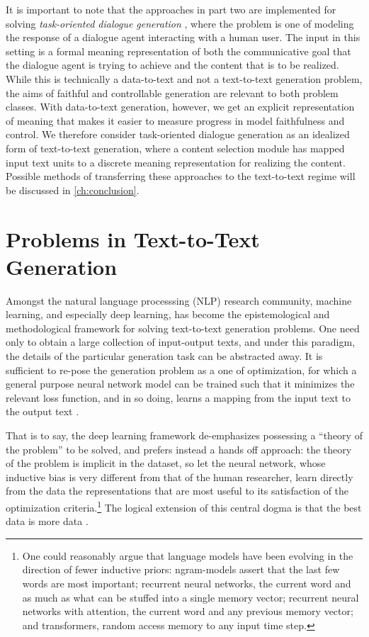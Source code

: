 It is important to note that the approaches in part two are implemented for
solving \textit{task-oriented dialogue generation} \citep{mairesse2010}, where
the problem is one of modeling the response of a dialogue agent interacting
with a human user. The input in this setting is a formal meaning
representation of both the communicative goal that the dialogue agent is
trying to achieve and the content that is to be realized. While this is
technically a data-to-text and not a text-to-text generation problem, the aims
of faithful and controllable generation are relevant to both problem classes.
With data-to-text generation, however, we get an explicit representation of
meaning that makes it easier to measure progress in model faithfulness and
control. We therefore consider task-oriented dialogue generation as an
idealized form of text-to-text generation, where a content selection module
has mapped input text units to a discrete meaning representation for realizing
the content.  Possible methods of transferring these approaches to the
text-to-text regime will be discussed in \autoref{ch:conclusion}.


\section{Problems in Text-to-Text Generation}
  
Amongst the natural language processsing (NLP) research community, machine
learning, and especially deep learning, has become the 
epistemological and methodological framework  for solving text-to-text
generation problems.  One need only to obtain a large collection of
input-output texts, and under this paradigm, the details of the particular
generation task can be abstracted away. It is sufficient to re-pose the
generation problem as a one of optimization, for which a general purpose
neural network model can be trained such that it minimizes the relevant loss
function, and in so doing, learns a mapping from the input text to the output
text \citep{sutskever2014,bahdanau2015,rush2015,nallapati2016,see2017}. 

That is to say, the deep learning framework de-emphasizes possessing a
``theory of the problem'' to be solved, and prefers instead a hands off
approach: the theory of the problem is implicit in the dataset, so let the
neural network, whose inductive bias is very different from that of the human
researcher, learn directly from the data the representations that are most
useful to its satisfaction of the optimization criteria.\footnote{One could
reasonably argue that language models have been evolving in the direction of
fewer inductive priors: ngram-models assert that the last few words are most
important; recurrent neural networks, the current word and as much as what can
be stuffed into a single memory vector; recurrent neural networks with
attention, the current word and any previous memory vector; and transformers,
random access memory to any input time step.} The logical extension of this
central dogma is that the best data is more data \citep{halevy2009}.  

